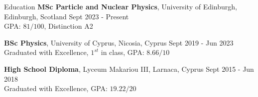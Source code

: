 \documentclass{resume} %
\begin{document}
        \begin{rSection}{Education}
                {\bf MSc Particle and Nuclear Physics}, University of Edinburgh, Edinburgh, Scotland \hfill {Sept 2023 - Present}\\
                GPA: $81/100$, Distinction A2
                
                {\bf BSc Physics}, University of Cyprus, Nicosia, Cyprus \hfill {Sept 2019 - Jun 2023}\\
                Graduated with Excellence, $1^{st}$ in class, GPA: $8.66/10$
                
                {\bf High School Diploma}, Lyceum Makariou III, Larnaca, Cyprus \hfill {Sept 2015 - Jun 2018}\\
        Graduated with Excellence, GPA: $19.22/20$
        \end{rSection}

        \bigbreak
\end{document}
